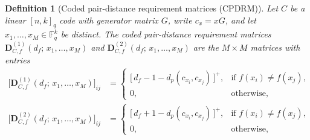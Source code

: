 \documentclass[11pt,draftclsnofoot,journal,onecolumn]{IEEEtran}
\newtheorem{definition}{Definition}
\begin{document}
    

        \begin{definition}[Coded pair-distance requirement matrices (CPDRM)]
        \label{def:CPDRM}
        Let $C$ be a linear $[n,k]_q$ code with generator matrix $G$, write $c_x = xG$, and let
        $x_1, \ldots, x_M \in \mathbb{F}_q^{k}$ be distinct. The \emph{coded pair-distance
        requirement matrices}
        $\boldsymbol{D}^{(1)}_{C,f}(d_f;\, x_1, \ldots, x_M)$ and
        $\boldsymbol{D}^{(2)}_{C,f}(d_f;\, x_1, \ldots, x_M)$ are the $M \times M$ matrices with
        entries
        \begin{align*}
        \bigl[\boldsymbol{D}^{(1)}_{C,f}(d_f;\, x_1, \ldots, x_M)\bigr]_{ij}
        &=
        \begin{cases}
            \bigl[\,d_f - 1 - d_p(c_{x_i}, c_{x_j})\,\bigr]^{+},
                & \text{if } f(x_i) \neq f(x_j),\\[2pt]
            0, & \text{otherwise},
        \end{cases}
        \\[6pt]
        \bigl[\boldsymbol{D}^{(2)}_{C,f}(d_f;\, x_1, \ldots, x_M)\bigr]_{ij}
        &=
        \begin{cases}
            \bigl[\,d_f + 1 - d_p(c_{x_i}, c_{x_j})\,\bigr]^{+},
                & \text{if } f(x_i) \neq f(x_j),\\[2pt]
            0, & \text{otherwise},
        \end{cases}
        \end{align*}
        \end{definition}
        
\end{document}
